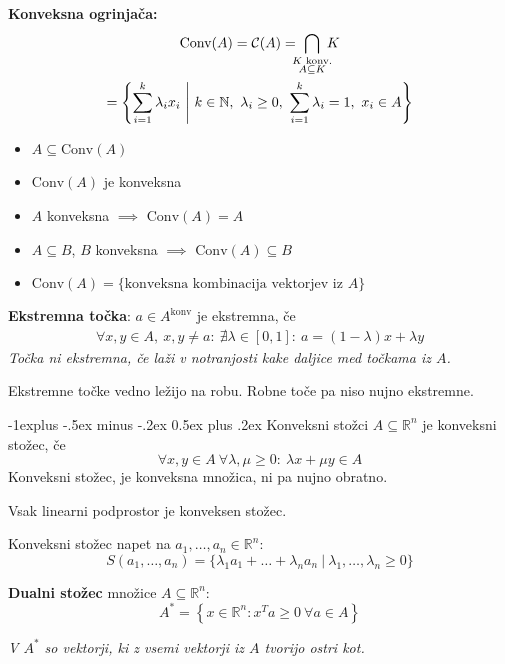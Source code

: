 \documentclass[a4paper,8pt]{extarticle}
\makeatletter
\renewcommand{\subsection}{\@startsection{subsection}{2}{0mm}%
                                {-1explus -.5ex minus -.2ex}%
                                {0.5ex plus .2ex}%
                                {\normalfont\normalsize\bfseries}}
\makeatother
\begin{document}
\begin{multicols}{4}
\textbf{Konveksna ogrinjača:} 
\begin{gather*}
	\text{Conv}(A) = \mathcal{C}(A) =\ \bigcap_{\mathclap{\substack{K \text{ konv.}\\ A \subseteq K}}}\ K \\
	= \left\{ \sum_{i=1}^k \lambda_i x_i\ \middle|\ k \in \mathbb{N},\ \lambda_i \geq 0,\ \sum_{i=1}^k \lambda_i = 1,\ x_i \in A \right\}
\end{gather*}
\begin{itemize}
	\item $A \subseteq \text{Conv}(A)$
	\item $\text{Conv}(A)$ je konveksna
	\item $A$ konveksna $\implies$ $\text{Conv}(A) = A$
	\item $A \subseteq B$, $B$ konveksna $\implies$ $\text{Conv}(A) \subseteq B$
	\item $\text{Conv}(A) = \{\text{konveksna kombinacija vektorjev iz $A$}\}$
\end{itemize}

\textbf{Ekstremna točka}:
$a \in A^{\text{konv}}$ je ekstremna, če
\begin{align*}
	\forall x,y \in A,\ x,y \neq a:\  \nexists \lambda \in [0,1]:\ a = (1-\lambda)x + \lambda y
\end{align*}
\emph{Točka ni ekstremna, če laži v notranjosti kake daljice med točkama iz $A$.}

Ekstremne točke vedno ležijo na robu. Robne toče pa niso nujno ekstremne.

\subsection{Konveksni stožci}
$A \subseteq \mathbb{R}^n$ je konveksni stožec, če
\[ \forall x,y \in A\ \forall \lambda, \mu \geq 0: \ \lambda x + \mu y \in A \]
Konveksni stožec, je konveksna množica, ni pa nujno obratno.

Vsak linearni podprostor je konveksen stožec.

Konveksni stožec napet na $a_1, \dots, a_n \in \mathbb{R}^n$:
\[S(a_1, \dots, a_n) = \{\lambda_1 a_1 + \dots + \lambda_n a_n\ |\ \lambda_1, \dots, \lambda_n \geq 0\}\]

\textbf{Dualni stožec} množice $A \subseteq \mathbb{R}^n$:
\[ A^* = \left\{ x \in \mathbb{R}^n : x^T a \geq 0\ \forall a \in A \right\}\]

\emph{V $A^*$ so vektorji, ki z vsemi vektorji iz $A$ tvorijo ostri kot.}


\end{multicols}
\end{document}

